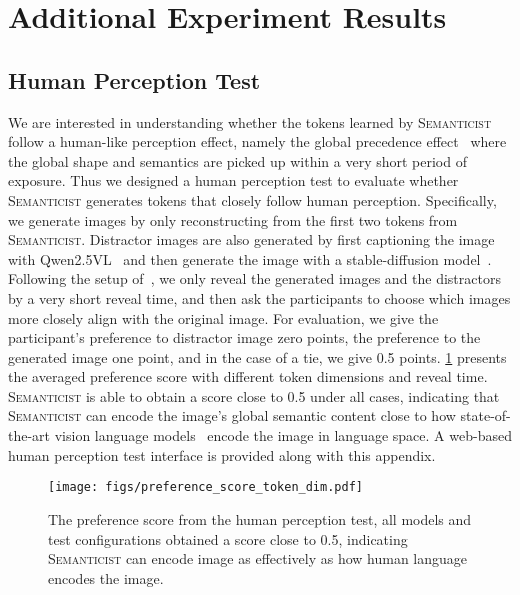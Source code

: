 \documentclass[10pt,twocolumn,letterpaper]{article}
\DeclareRobustCommand{\modelname}{\textsc{Semanticist}\xspace}
\begin{document}
\section{Additional Experiment Results}

\subsection{Human Perception Test}
\label{sec:human_eval}

We are interested in understanding whether the tokens learned by \modelname follow a human-like perception effect, namely the global precedence effect~\cite{NAVON1977353} where the global shape and semantics are picked up within a very short period of exposure.
Thus we designed a human perception test to evaluate whether \modelname generates tokens that closely follow human perception.
Specifically, we generate images by only reconstructing from the first two tokens from \modelname.
Distractor images are also generated by first captioning the image with Qwen2.5VL~\cite{bai2025qwen2} and then generate the image with a stable-diffusion model~\cite{LDM}.
Following the setup of~\cite{fei2007we}, we only reveal the generated images and the distractors by a very short reveal time, and then ask the participants to choose which images more closely align with the original image.
For evaluation, we give the participant's preference to distractor image zero points, the preference to the generated image one point, and in the case of a tie, we give 0.5 points.
\cref{fig:humaneval_curve} presents the averaged preference score with different token dimensions and reveal time.
\modelname is able to obtain a score close to 0.5 under all cases, indicating that \modelname can encode the image's global semantic content close to how state-of-the-art vision language models~\cite{bai2025qwen2} encode the image in language space.
A web-based human perception test interface is provided along with this appendix.


\begin{figure}
    \centering
    \texttt{[image: figs/preference\_score\_token\_dim.pdf]}
    \vspace{-.5em}
    \caption{The preference score from the human perception test, all models and test configurations obtained a score close to 0.5, indicating \modelname can encode image as effectively as how human language encodes the image.}
    \label{fig:humaneval_curve}
\end{figure}
\end{document}
